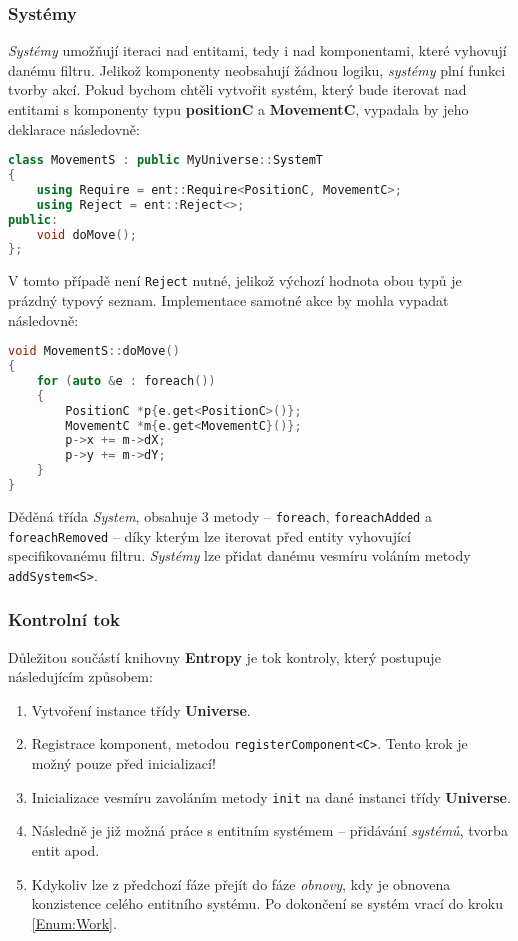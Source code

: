 \subsubsection*{Systémy}

\emph{Systémy} umožňují iteraci nad entitami, tedy i nad komponentami, které vyhovují danému filtru. Jelikož komponenty neobsahují žádnou logiku, \emph{systémy} plní funkci tvorby akcí. Pokud bychom chtěli vytvořit systém, který bude iterovat nad entitami s komponenty typu \textbf{positionC} a \textbf{MovementC}, vypadala by jeho deklarace následovně:

\begin{lstlisting}[backgroundcolor = \color{lightgray}, language = C++, xleftmargin = 2cm, framexleftmargin = 1em, tabsize=4]
class MovementS : public MyUniverse::SystemT
{
	using Require = ent::Require<PositionC, MovementC>;
	using Reject = ent::Reject<>;
public:
	void doMove();
};
\end{lstlisting}

\noindent V tomto případě není \texttt{Reject} nutné, jelikož výchozí hodnota obou typů je prázdný typový seznam. Implementace samotné akce by mohla vypadat následovně:

\begin{lstlisting}[backgroundcolor = \color{lightgray}, language = C++, xleftmargin = 2cm, framexleftmargin = 1em, tabsize=4]
void MovementS::doMove()
{
	for (auto &e : foreach())
	{
		PositionC *p{e.get<PositionC>()};
		MovementC *m{e.get<MovementC}()};
		p->x += m->dX;
		p->y += m->dY;
	}
}
\end{lstlisting}

\noindent Děděná třída \emph{System}, obsahuje 3 metody -- \texttt{foreach}, \texttt{foreachAdded} a \texttt{foreachRemoved} -- díky kterým lze iterovat před entity vyhovující specifikovanému filtru. \emph{Systémy} lze přidat danému vesmíru voláním metody \texttt{addSystem<S>}.

\subsubsection*{Kontrolní tok}

Důležitou součástí knihovny \textbf{Entropy} je tok kontroly, který postupuje následujícím způsobem: 
\begin{enumerate}
	\item Vytvoření instance třídy \textbf{Universe}.
	\item Registrace komponent, metodou \texttt{registerComponent<C>}. Tento krok je možný pouze před inicializací!
	\item Inicializace vesmíru zavoláním metody \texttt{init} na dané instanci třídy \textbf{Universe}.
	\item Následně je již možná práce s entitním systémem -- přidávání \emph{systémů}, tvorba entit apod. \label{Enum:Work}
	\item Kdykoliv lze z předchozí fáze přejít do fáze \emph{obnovy}, kdy je obnovena konzistence celého entitního systému. Po dokončení se systém vrací do kroku \ref{Enum:Work}.
\end{enumerate}

